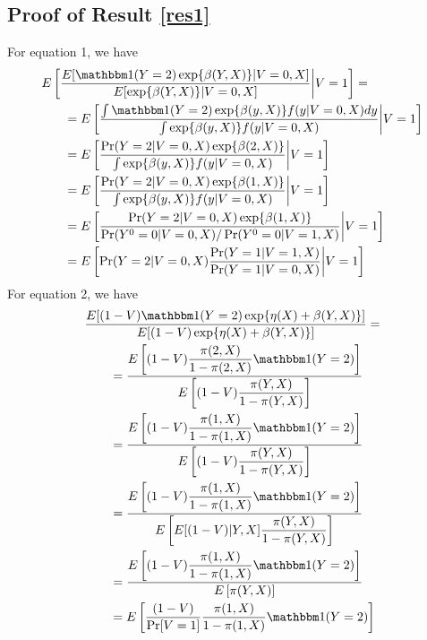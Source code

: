 \documentclass[12pt]{article}
\begin{document}
\begin{appendix}

    \renewcommand{\thefigure}{A\arabic{figure}}
    \setcounter{figure}{0}
    
    \renewcommand{\thetable}{A\arabic{table}}
    \setcounter{table}{0}
    
    \renewcommand{\theequation}{A\arabic{equation}}
    \setcounter{equation}{0}


\section{Proof of Result \ref{res1}}\label{sec:proof1}
For equation 1, we have
\begin{align*}
     E&\left[\dfrac{E[\mathbbm 1(Y=2)\exp\{\beta(Y,X)\} | V = 0, X]}{E[\exp\{\beta(Y,X)\} | V = 0, X]}\bigg|V = 1\right] = \\
     &\quad = E \left[\dfrac{\int \mathbbm 1(Y=2)\exp\{\beta(y,X)\} f(y| V = 0, X)dy}{\int \exp\{\beta(y,X)\} f(y| V = 0, X)}\bigg|V = 1\right] \\
     &\quad = E \left[\dfrac{\Pr(Y = 2 | V = 0, X)\exp\{\beta(2,X)\} }{\int \exp\{\beta(y,X)\} f(y| V = 0, X)}\bigg|V = 1\right] \\
     &\quad = E \left[\dfrac{\Pr(Y = 2 | V = 0, X)\exp\{\beta(1,X)\} }{\int \exp\{\beta(y,X)\} f(y| V = 0, X)}\bigg|V = 1\right] \\
     &\quad = E \left[\dfrac{\Pr(Y = 2 | V = 0, X)\exp\{\beta(1,X)\} }{\Pr(Y^0 = 0| V = 0, X)/\Pr(Y^0 =0|V = 1, X)}\bigg|V = 1\right] \\
     &\quad = E \left[\Pr(Y = 2|V = 0, X)\dfrac{\Pr(Y = 1 | V = 1, X)}{\Pr(Y = 1 | V = 0, X)}\bigg|V = 1\right]
\end{align*}
For equation 2, we have
\begin{align*}
     &\dfrac{E[(1-V)\mathbbm 1(Y=2)\exp\{\eta(X) + \beta(Y,X)\}]}{E[(1-V)\exp\{\eta(X) +\beta(Y,X)\}]} = \\
     &\qquad = \dfrac{E\left[(1-V)\dfrac{\pi(2,X)}{1-\pi(2,X)}\mathbbm 1(Y=2)\right]}{E\left[(1-V)\dfrac{\pi(Y, X)}{1-\pi(Y,X)}\right]} \\
     &\qquad = \dfrac{E\left[(1-V)\dfrac{\pi(1,X)}{1-\pi(1,X)}\mathbbm 1(Y=2)\right]}{E\left[(1-V)\dfrac{\pi(Y, X)}{1-\pi(Y,X)}\right]} \\
     &\qquad = \dfrac{E\left[(1-V)\dfrac{\pi(1,X)}{1-\pi(1,X)}\mathbbm 1(Y=2)\right]}{E\left[E[(1-V) | Y, X]\dfrac{\pi(Y, X)}{1-\pi(Y,X)}\right]} \\
     &\qquad = \dfrac{E\left[(1-V)\dfrac{\pi(1,X)}{1-\pi(1,X)}\mathbbm 1(Y=2)\right]}{E\left[\pi(Y,X)\right]} \\
     &\qquad = E\left[\dfrac{(1-V)}{\Pr[V=1]}\dfrac{\pi(1,X)}{1-\pi(1,X)}\mathbbm 1(Y=2)\right]
\end{align*}


\end{appendix}
\end{document}
